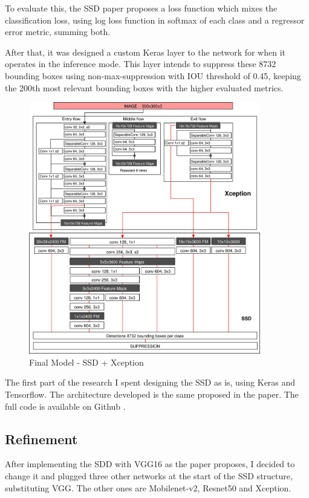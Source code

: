 \documentclass[11pt, a4paper, twocolumn]{article}
\begin{document}
To evaluate this, the SSD paper proposes a loss function which mixes the classification loss, using log loss function in softmax of each class and a regressor error metric, summing both.

After that, it was designed a custom Keras layer to the network for when it operates in the inference mode. This layer intends to suppress these 8732 bounding boxes using non-max-suppression with IOU threshold of 0.45, keeping the 200th most relevant bounding boxes with the higher evaluated metrics.

\begin{figure}[!ht]
	\centering
	\includegraphics[width=0.9\textwidth]{xception+ssd.jpg}
	\caption{\scriptsize Final Model - SSD + Xception}
	\label{architecture}
\end{figure}

The first part of the research I spent designing the SSD as is, using Keras and Tensorflow. The architecture developed is the same proposed in the paper. The full code is available on Github \cite{balmeidas}. 

\subsection{Refinement}

After implementing the SDD with VGG16 as the paper proposes, I decided to change it and plugged three other networks at the start of the SSD structure, substituting VGG. The other ones are Mobilenet-v2, Resnet50 and Xception.
\end{document}
